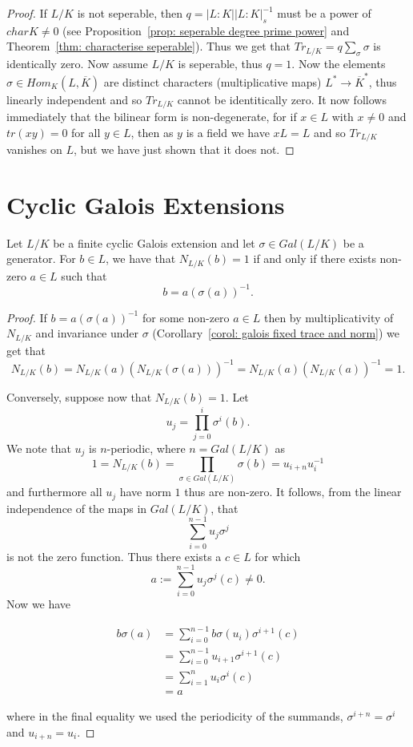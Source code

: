 \documentclass[twoside, a4paper, 10pt]{amsart}
\begin{document}
\begin{proof} If $L/K$ is not seperable, then $q = |L:K||L:K|_s^{-1}$ must be a power of $char K \neq 0$ (see Proposition~\ref{prop: seperable degree prime power} and Theorem~\ref{thm: characterise seperable}). Thus we get that $Tr_{L/K} = q \sum_{\sigma} \sigma$ is identically zero. Now assume $L/K$ is seperable, thus $q = 1$. Now the elements $\sigma \in Hom_K(L, \overline{K})$ are distinct characters (multiplicative maps) $L^* \to \overline{K}^*$, thus linearly independent and so $Tr_{L/K}$ cannot be identitically zero. It now follows immediately that the bilinear form is non-degenerate, for if $x \in L$ with $x \neq 0$ and $tr(xy) = 0$ for all $y \in L$, then as $y$ is a field we have $xL=L$ and so $Tr_{L/K}$ vanishes on $L$, but we have just shown that it does not. \end{proof}

\section{Cyclic Galois Extensions}

\begin{thm}[Hilbert 90] Let $L/K$ be a finite cyclic Galois extension and let $\sigma \in Gal(L/K)$ be a generator. For $b \in L$, we have that $N_{L/K}(b) = 1$ if and only if there exists non-zero $a \in L$ such that $$b = a (\sigma(a))^{-1}.$$

\begin{proof} If $b = a (\sigma(a))^{-1}$ for some non-zero $a \in L$ then by multiplicativity of $N_{L/K}$ and invariance under $\sigma$ (Corollary~\ref{corol: galois fixed trace and norm}) we get that $$N_{L/K}(b) = N_{L/K}(a) \left( N_{L/K}(\sigma(a)) \right)^{-1} = N_{L/K}(a) (N_{L/K}(a))^{-1} = 1.$$

Conversely, suppose now that $N_{L/K}(b)=1$. Let $$u_j = \prod_{j=0}^i \sigma^{i}(b).$$ We note that $u_j$ is $n$-periodic, where $n = Gal(L/K)$ as $$1 = N_{L/K}(b) = \prod_{\sigma \in Gal(L/K)} \sigma(b) = u_{i+n}u_i^{-1}$$ and furthermore all $u_j$ have norm $1$ thus are non-zero. It follows, from the linear independence of the maps in $Gal(L/K)$, that $$\sum_{i=0}^{n-1} u_j \sigma^{j}$$ is not the zero function. Thus there exists a $c \in L$ for which $$a := \sum_{i=0}^{n-1} u_j \sigma^{j}(c) \neq 0. $$ Now we have 

\begin{align*} b \sigma(a) &= \sum_{i=0}^{n-1} b\sigma(u_i) \sigma^{i+1}(c) \\
&= \sum_{i=0}^{n-1} u_{i+1} \sigma^{i+1}(c) \\
&= \sum_{i=1}^n u_{i} \sigma^{i}(c)\\
&= a \end{align*}

where in the final equality we used the periodicity of the summands, $\sigma^{i+n} = \sigma^i$ and $u_{i+n} = u_i$. \end{proof}

\end{thm}
\end{document}
